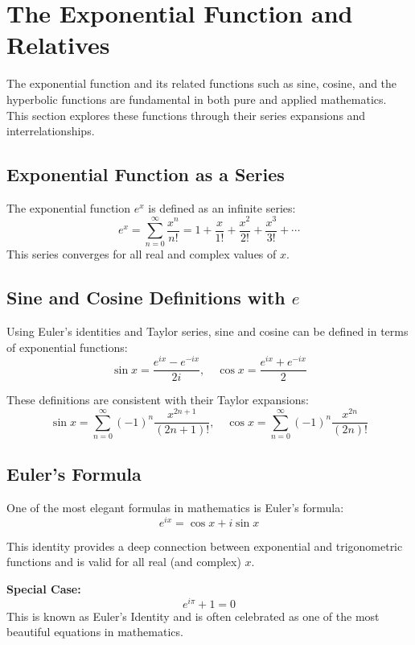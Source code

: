 \newpage
\section{The Exponential Function and Relatives}

The exponential function and its related functions such as sine, cosine, and the hyperbolic functions are fundamental in both pure and applied mathematics. This section explores these functions through their series expansions and interrelationships.

\subsection{Exponential Function as a Series}

The exponential function \(e^x\) is defined as an infinite series:
\[
e^x = \sum_{n=0}^{\infty} \frac{x^n}{n!}
= 1 + \frac{x}{1!} + \frac{x^2}{2!} + \frac{x^3}{3!} + \cdots
\]
This series converges for all real and complex values of \(x\).

\subsection{Sine and Cosine Definitions with \texorpdfstring{\(e\)}{e}}

Using Euler's identities and Taylor series, sine and cosine can be defined in terms of exponential functions:
\[
\sin x = \frac{e^{ix} - e^{-ix}}{2i}, \quad
\cos x = \frac{e^{ix} + e^{-ix}}{2}
\]

These definitions are consistent with their Taylor expansions:
\[
\sin x = \sum_{n=0}^{\infty} {(-1)}^n \frac{x^{2n+1}}{(2n+1)!}, \quad
\cos x = \sum_{n=0}^{\infty} {(-1)}^n \frac{x^{2n}}{(2n)!}
\]

\subsection{Euler's Formula}

One of the most elegant formulas in mathematics is Euler’s formula:
\[
e^{ix} = \cos x + i\sin x
\]

This identity provides a deep connection between exponential and trigonometric functions and is valid for all real (and complex) \(x\).
\vspace{\baselineskip}

\textbf{Special Case:}
\[
e^{i\pi} + 1 = 0
\]
This is known as Euler's Identity and is often celebrated as one of the most beautiful equations in mathematics.

